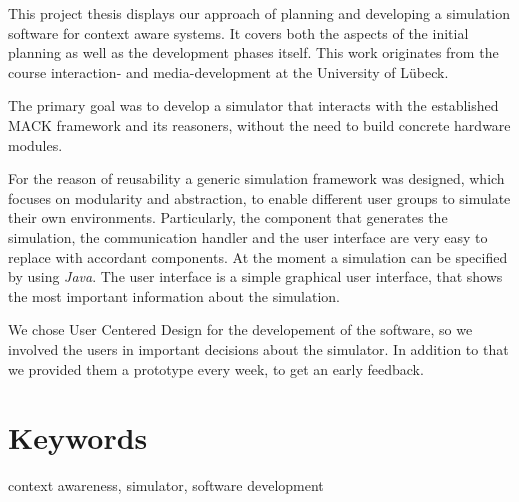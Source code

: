 \documentclass[11pt,    %
  english,ngerman,      %
  paper=a4,             %
  oneside,              %
  tablecaptionbelow,    %
  DIV=calc              %
  ]{scrbook}            %
\newcommand{\imiscomment}[1]{\textit{\color{imiscommentcolor}#1}}
\begin{document}
This project thesis displays our approach of planning and developing a simulation software for context aware systems. It covers both the aspects of the initial planning as well as the development phases itself. This work originates from the course interaction- and media-development at the University of Lübeck.

The primary goal was to develop a simulator that interacts with the established MACK framework and its reasoners, without the need to build concrete hardware modules.

For the reason of reusability a generic simulation framework was designed, which focuses on modularity and abstraction, to enable different user groups to simulate their own environments. Particularly, the component that generates the simulation, the communication handler and the user interface are very easy to replace with accordant components. At the moment a simulation can be specified by using \textit{Java}. The user interface is a simple graphical user interface, that shows the most important information about the simulation.

We chose User Centered Design for the developement of the software, so we involved the users in important decisions about the simulator. In addition to that we provided them a prototype     
 every week, to get an early feedback.

\vfill

\section*{Keywords} context awareness, simulator, software development

\clearpage
\setcounter{tocdepth}{1}
\tableofcontents

\mainmatter







%





\end{document}
